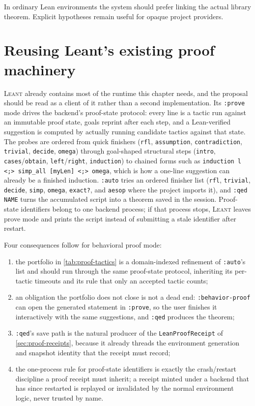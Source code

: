 \documentclass[11pt,oneside]{report}
\newcommand{\Leant}{\textsc{Leant}\xspace}
\newcommand{\code}[1]{\texttt{#1}}
\begin{document}
In ordinary Lean environments the system should prefer linking the actual library theorem. Explicit hypotheses remain useful for opaque project providers.

\section{Reusing Leant's existing proof machinery}
\label{sec:proof-reuse}

\Leant already contains most of the runtime this chapter needs, and the proposal should be read as a client of it rather than a second implementation. Its \code{:prove} mode drives the backend's proof-state protocol: every line is a tactic run against an immutable proof state, goals reprint after each step, and a Lean-verified suggestion is computed by actually running candidate tactics against that state. The probes are ordered from quick finishers (\code{rfl}, \code{assumption}, \code{contradiction}, \code{trivial}, \code{decide}, \code{omega}) through goal-shaped structural steps (\code{intro}, \code{cases}/\code{obtain}, \code{left}/\code{right}, \code{induction}) to chained forms such as \code{induction l <;> simp\_all [myLen] <;> omega}, which is how a one-line suggestion can already be a finished induction. \code{:auto} tries an ordered finisher list (\code{rfl}, \code{trivial}, \code{decide}, \code{simp}, \code{omega}, \code{exact?}, and \code{aesop} where the project imports it), and \code{:qed NAME} turns the accumulated script into a theorem saved in the session. Proof-state identifiers belong to one backend process; if that process stops, \Leant leaves prove mode and prints the script instead of submitting a stale identifier after restart.

Four consequences follow for behavioral proof mode:

\begin{enumerate}[leftmargin=2em]
\item the portfolio in \cref{tab:proof-tactics} is a domain-indexed refinement of \code{:auto}'s list and should run through the same proof-state protocol, inheriting its per-tactic timeouts and its rule that only an accepted tactic counts;
\item an obligation the portfolio does not close is not a dead end: \code{:behavior-proof} can open the generated statement in \code{:prove}, so the user finishes it interactively with the same suggestions, and \code{:qed} produces the theorem;
\item \code{:qed}'s save path is the natural producer of the \code{LeanProofReceipt} of \cref{sec:proof-receipts}, because it already threads the environment generation and snapshot identity that the receipt must record;
\item the one-process rule for proof-state identifiers is exactly the crash/restart discipline a proof receipt must inherit; a receipt minted under a backend that has since restarted is replayed or invalidated by the normal environment logic, never trusted by name.
\end{enumerate}
\end{document}
